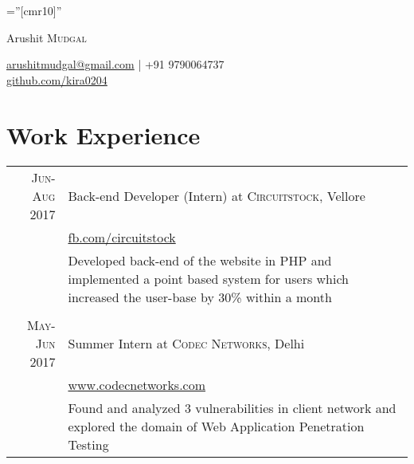 \documentclass[a4paper,1pt]{article}
\begin{document}

\pagestyle{empty} %

\font\fb=''[cmr10]'' %

\par{\centering
		{\Huge Arushit \textsc{Mudgal}
		
	}\href{mailto:arushitmudgal@gmail.com}{arushitmudgal@gmail.com} | +91 9790064737\\
	\href{http://github.com/kira0204}{github.com/kira0204}\bigskip\par}

%

\section{Work Experience}
\begin{tabular}{r|p{11cm}}

 \textsc{Jun-Aug 2017} & Back-end Developer (Intern) at \textsc{Circuitstock}, Vellore \\&\href{https://www.facebook.com/circuitstock/}{fb.com/circuitstock}\\&\footnotesize{Developed back-end of the website in PHP and implemented a point based system for users which increased the user-base by 30\% within a month}\\\multicolumn{2}{c}{} \\
\textsc{May-Jun 2017} & Summer Intern at \textsc{Codec Networks}, Delhi \\&\href{https://www.codecnetworks.com}{www.codecnetworks.com}\\&\footnotesize{Found and analyzed 3 vulnerabilities in client network and explored the domain of Web Application Penetration Testing}
\end{tabular}
\end{document}
